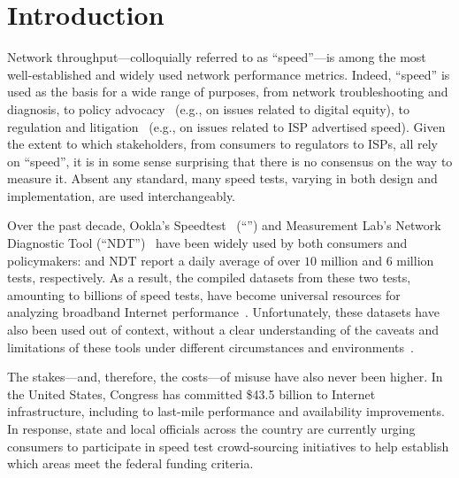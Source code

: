 \section{Introduction}\label{sec:intro}

Network throughput---colloquially referred to as ``speed''---is among the most
well-established and widely used network performance metrics.  Indeed, ``speed''
is used as the basis for a wide range of purposes, from network troubleshooting
and diagnosis, to policy
advocacy~\cite{battle-for-the-net} (e.g., on
issues related to digital equity), to regulation and
litigation~\cite{fcc2022frontier} (e.g., on issues related to ISP advertised
speed).  Given the extent to which stakeholders, from consumers to regulators to
ISPs, all rely on ``speed'', it is in some sense surprising that there is no
consensus on the way to measure it. Absent any standard, many speed tests, varying in
both design and implementation, are used interchangeably. 

Over the past decade, Ookla's Speedtest~\cite{ookla2022speedtest} (``\ookla'')
and Measurement Lab's Network Diagnostic Tool (``NDT'')~\cite{mlab2022speedtest}
have been widely used by both consumers and policymakers: \ookla and NDT report
a daily average of over $10$ million and  $6$ million
tests, respectively. As a result, the compiled datasets
from these two tests, amounting to billions of speed
tests, have become universal
resources for analyzing broadband Internet performance~\cite{battle-for-the-net,
fcc2022frontier}. Unfortunately, these datasets have
also been used out of context, without a clear understanding of the caveats and
limitations of these tools under different circumstances and
environments~\cite{ookla-ny-case-study}. 

The stakes---and, therefore, the costs---of misuse have also never been higher. In the United
States, Congress has committed \$43.5 billion to Internet infrastructure,
including to last-mile performance and availability
improvements. 
In response,
state and local officials across the country are currently urging consumers to
participate in speed test crowd-sourcing initiatives to help establish which
areas meet the federal funding criteria.

